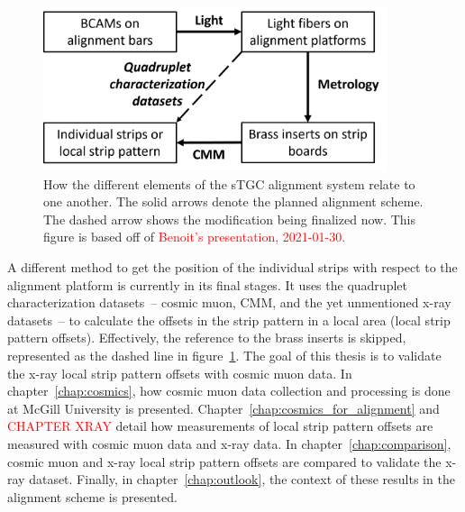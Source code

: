 \begin{figure}
    \centering
    \includegraphics[width = 0.9\textwidth]{figures/alignment_system_element_relations.png}
    \caption{How the different elements of the sTGC alignment system relate to one another. The solid arrows denote the planned alignment scheme. The dashed arrow shows the modification being finalized now. This figure is based off of \textcolor{red}{Benoit's presentation, 2021-01-30.}}
    \label{fig:alignment_elements}
\end{figure}

A different method to get the position of the individual strips with respect to the alignment platform is currently in its final stages. It uses the quadruplet characterization datasets~-- cosmic muon, CMM, and the yet unmentioned x-ray datasets~-- to calculate the offsets in the strip pattern in a local area (local strip pattern offsets). Effectively, the reference to the brass inserts is skipped, represented as the dashed line in figure~\ref{fig:alignment_elements}. The goal of this thesis is to validate the x-ray local strip pattern offsets with cosmic muon data. In chapter~\ref{chap:cosmics}, how cosmic muon data collection and processing is done at McGill University is presented. Chapter~\ref{chap:cosmics_for_alignment} and \textcolor{red}{CHAPTER XRAY} detail how measurements of local strip pattern offsets are measured with cosmic muon data and x-ray data. In chapter~\ref{chap:comparison}, cosmic muon and x-ray local strip pattern offsets are compared to validate the x-ray dataset. Finally, in chapter~\ref{chap:outlook}, the context of these results in the alignment scheme is presented.


